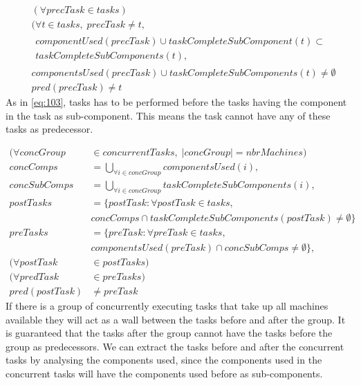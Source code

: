   \begin{equation}
  \begin{aligned}\label{eq:90}
  &(\forall precTask \in tasks) \\
  &(\forall t \in tasks, \; precTask \neq t,\\
  &\begin{aligned}componentUsed(precTask) \cup taskCompleteSubComponent(t) \subset\\
  taskCompleteSubComponents(t), \end{aligned}\\
  &componentsUsed(precTask) \cup taskCompleteSubComponents(t) \neq \emptyset \\
  &pred(precTask) \neq t
  \end{aligned}
  \end{equation}
 As in \ref{eq:103}, tasks has to be performed before the tasks having the component in the task as sub-component. This means the task cannot have any of these tasks as predecessor.
  
  \begin{equation}
  \begin{aligned}\label{eq:91}
  (\forall concGroup &\in concurrentTasks, \; |concGroup| = nbrMachines) \\
  concComps &= \bigcup_{\forall i \in concGroup}componentsUsed(i), \\
  concSubComps &= \bigcup_{\forall i \in concGroup}taskCompleteSubComponents(i), \\
  postTasks &= \{postTask : \forall postTask \in tasks,\\
  &concComps \cap taskCompleteSubComponents(postTask) \neq \emptyset\}\\
  preTasks &= \{preTask : \forall preTask \in tasks,\\
  &componentsUsed(preTask) \cap concSubComps \neq \emptyset\}, \\
  (\forall postTask &\in postTasks) \\
  (\forall predTask &\in preTasks) \\
  pred(postTask) &\neq preTask
  \end{aligned}
  \end{equation}
  If there is a group of concurrently executing tasks that take up all machines available they will act as a wall between the tasks before and after the group. It is guaranteed that the tasks after the group cannot have the tasks before the group as predecessors. We can extract the tasks before and after the concurrent tasks by analysing the components used, since the components used in the concurrent tasks will have the components used before as sub-components.
 